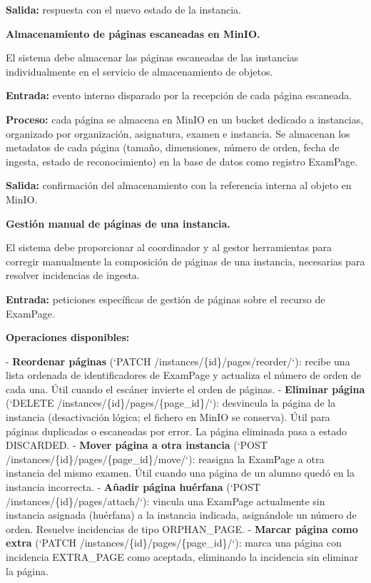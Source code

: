 \begin{functional}
\begin{functional}
    \textbf{Salida:} respuesta con el nuevo estado de la instancia.

    \item \textbf{Almacenamiento de páginas escaneadas en MinIO.}

    El sistema debe almacenar las páginas escaneadas de las instancias individualmente en el servicio de almacenamiento de objetos.

    \textbf{Entrada:} evento interno disparado por la recepción de cada página escaneada.

    \textbf{Proceso:} cada página se almacena en MinIO en un bucket dedicado a instancias, organizado por organización, asignatura, examen e instancia. Se almacenan los metadatos de cada página (tamaño, dimensiones, número de orden, fecha de ingesta, estado de reconocimiento) en la base de datos como registro ExamPage.

    \textbf{Salida:} confirmación del almacenamiento con la referencia interna al objeto en MinIO.

    \item \textbf{Gestión manual de páginas de una instancia.}

    El sistema debe proporcionar al coordinador y al gestor herramientas para corregir manualmente la composición de páginas de una instancia, necesarias para resolver incidencias de ingesta.

    \textbf{Entrada:} peticiones específicas de gestión de páginas sobre el recurso de ExamPage.

    \textbf{Operaciones disponibles:}

    - \textbf{Reordenar páginas} (`PATCH /instances/\{id\}/pages/reorder/`): recibe una lista ordenada de identificadores de ExamPage y actualiza el número de orden de cada una. Útil cuando el escáner invierte el orden de páginas. - \textbf{Eliminar página} (`DELETE /instances/\{id\}/pages/\{page\_id\}/`): desvincula la página de la instancia (desactivación lógica; el fichero en MinIO se conserva). Útil para páginas duplicadas o escaneadas por error. La página eliminada pasa a estado DISCARDED. - \textbf{Mover página a otra instancia} (`POST /instances/\{id\}/pages/\{page\_id\}/move/`): reasigna la ExamPage a otra instancia del mismo examen. Útil cuando una página de un alumno quedó en la instancia incorrecta. - \textbf{Añadir página huérfana} (`POST /instances/\{id\}/pages/attach/`): vincula una ExamPage actualmente sin instancia asignada (huérfana) a la instancia indicada, asignándole un número de orden. Resuelve incidencias de tipo ORPHAN\_PAGE. - \textbf{Marcar página como extra} (`PATCH /instances/\{id\}/pages/\{page\_id\}/`): marca una página con incidencia EXTRA\_PAGE como aceptada, eliminando la incidencia sin eliminar la página.


\end{functional}
\end{functional}
